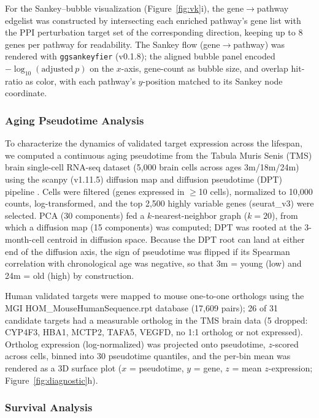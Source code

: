 \documentclass[12pt,a4paper]{article}
\begin{document}
For the Sankey--bubble visualization (Figure~\ref{fig:vk}i), the gene$\rightarrow$pathway edgelist was constructed by intersecting each enriched pathway's gene list with the PPI perturbation target set of the corresponding direction, keeping up to 8 genes per pathway for readability. The Sankey flow (gene$\rightarrow$pathway) was rendered with \texttt{ggsankeyfier} (v0.1.8); the aligned bubble panel encoded $-\log_{10}(\text{adjusted}\ p)$ on the $x$-axis, gene-count as bubble size, and overlap hit-ratio as color, with each pathway's $y$-position matched to its Sankey node coordinate.

\subsubsection{Aging Pseudotime Analysis}

To characterize the dynamics of validated target expression across the lifespan, we computed a continuous aging pseudotime from the Tabula Muris Senis (TMS) brain single-cell RNA-seq dataset \citep{schaum2019} (5{,}000 brain cells across ages 3m/18m/24m) using the scanpy (v1.11.5) diffusion map and diffusion pseudotime (DPT) pipeline \citep{wolf2018,haghverdi2016}. Cells were filtered (genes expressed in $\geq$10 cells), normalized to 10{,}000 counts, log-transformed, and the top 2{,}500 highly variable genes (seurat\_v3) were selected. PCA (30 components) fed a $k$-nearest-neighbor graph ($k=20$), from which a diffusion map (15 components) was computed; DPT was rooted at the 3-month-cell centroid in diffusion space. Because the DPT root can land at either end of the diffusion axis, the sign of pseudotime was flipped if its Spearman correlation with chronological age was negative, so that 3m = young (low) and 24m = old (high) by construction.

Human validated targets were mapped to mouse one-to-one orthologs using the MGI HOM\_MouseHumanSequence.rpt database (17{,}609 pairs); 26 of 31 candidate targets had a measurable ortholog in the TMS brain data (5 dropped: CYP4F3, HBA1, MCTP2, TAFA5, VEGFD, no 1:1 ortholog or not expressed). Ortholog expression (log-normalized) was projected onto pseudotime, $z$-scored across cells, binned into 30 pseudotime quantiles, and the per-bin mean was rendered as a 3D surface plot ($x$ = pseudotime, $y$ = gene, $z$ = mean $z$-expression; Figure~\ref{fig:diagnostic}h).

\subsubsection{Survival Analysis}
\end{document}
